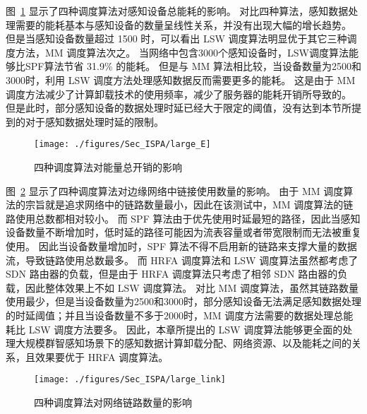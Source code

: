 图~\ref{fig_largeE} 显示了四种调度算法对感知设备总能耗的影响。
对比四种算法，感知数据处理需要的能耗基本与感知设备的数量呈线性关系，并没有出现大幅的增长趋势。
但是当感知设备数量超过 1500 时，可以看出 LSW 调度算法明显优于其它三种调度方法，MM 调度算法次之。
当网络中包含3000个感知设备时，LSW调度算法能够比SPF算法节省 31.9\% 的能耗。
但是与 MM 算法相比较，当设备数量为2500和3000时，利用 LSW 调度方法处理感知数据反而需要更多的能耗。
这是由于 MM 调度方法减少了计算卸载技术的使用频率，减少了服务器的能耗开销所导致的。
但是此时，部分感知设备的数据处理时延已经大于限定的阈值，没有达到本节所提到的对于感知数据处理时延的限制。

\begin{figure}[!h]
  \centering
  \texttt{[image: ./figures/Sec\_ISPA/large\_E]}
  \vspace{-0.5em}
  \caption{四种调度算法对能量总开销的影响}
  \label{fig_largeE}
  \vspace{-1em}
\end{figure}

图~\ref{fig_largeL} 显示了四种调度算法对边缘网络中链接使用数量的影响。
由于 MM 调度算法的宗旨就是追求网络中的链路数量最小，因此在该测试中，MM 调度算法的链路使用总数都相对较小。
而 SPF 算法由于优先使用时延最短的路径，因此当感知设备数量不断增加时，低时延的路径可能因为流表容量或者带宽限制而无法被重复使用。
因此当设备数量增加时，SPF 算法不得不启用新的链路来支撑大量的数据流，导致链路使用总数最多。
而 HRFA 调度算法和 LSW 调度算法虽然都考虑了 SDN 路由器的负载，但是由于 HRFA 调度算法只考虑了相邻 SDN 路由器的负载，因此整体效果上不如 LSW 调度算法。
对比 MM 调度算法，虽然其链路数量使用最少，但是当设备数量为2500和3000时，部分感知设备无法满足感知数据处理的时延阈值；并且当设备数量不多于2000时，MM 调度方法需要的数据处理总能耗比 LSW 调度方法要多。
因此，本章所提出的 LSW 调度算法能够更全面的处理大规模群智感知场景下的感知数据计算卸载分配、网络资源、以及能耗之间的关系，且效果要优于 HRFA 调度算法。

\begin{figure}[!h]
  \centering
  \texttt{[image: ./figures/Sec\_ISPA/large\_link]}
  \vspace{-0.5em}
  \caption{四种调度算法对网络链路数量的影响}
  \vspace{-2em}
  \label{fig_largeL}
\end{figure}

